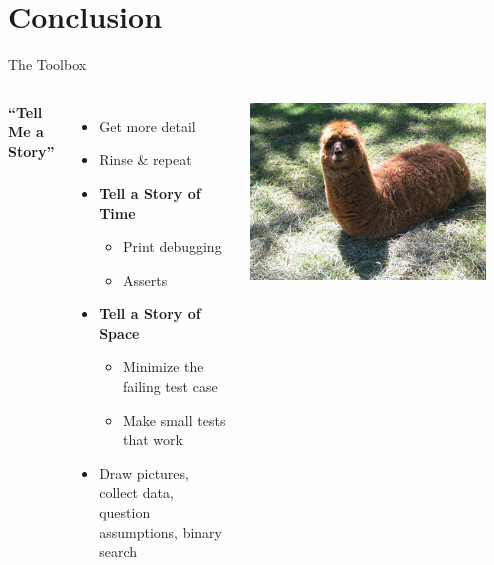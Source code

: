 \documentclass[xcolor=dvipsnames]{beamer}
\begin{document}
\section{Conclusion}


\begin{frame}{The Toolbox}
	\begin{columns}[l]
	\textbf{``Tell Me a Story''}
	\begin{itemize}
		\item Get more detail
		\item Rinse \& repeat
		\pause
		\item {\bf Tell a Story of Time}
		\begin{itemize}
			\item Print debugging
			\item Asserts
		\end{itemize}
		\pause
		\item {\bf Tell a Story of Space}
		\begin{itemize}
			\item Minimize the failing test case
			\item Make small tests that work
		\end{itemize}
		\pause
		\item Draw pictures, collect data, question assumptions, binary search
	\end{itemize}
	\pause
	\begin{center}
		\includegraphics[width=0.9\textwidth]{vip1066720.jpg}
	\end{center}
	\end{columns}
\end{frame}
\end{document}
